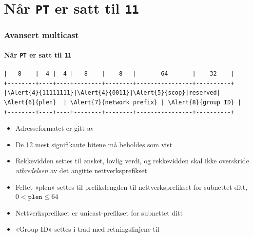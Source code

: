 \section{Når \texttt{PT} er satt til \texttt{11}}
\begin{frame}[fragile]%
  \frametitle{Avansert multicast}
  \framesubtitle{Når \texttt{PT} er satt til \texttt{11}}
  \pause
\begin{Verbatim}[commandchars=\\\{\},fontsize=\tiny]
|   8    |  4 |  4 |   8    |    8   |       64       |    32    |
+--------+----+----+--------+--------+----------------+----------+
|\Alert{4}{11111111}|\Alert{4}{0011}|\Alert{5}{scop}|reserved|  \Alert{6}{plen}  | \Alert{7}{network prefix} | \Alert{8}{group ID} |
+--------+----+----+--------+--------+----------------+----------+
\end{Verbatim}
  \pause
  \begin{itemize}[<+->]
  \item Adresseformatet er gitt av 
  \item \alert<4>{De 12 mest signifikante bitene} må beholdes som vist
  \item \alert<5>{Rekkevidden} settes til ønsket, lovlig verdi, og
    rekkevidden skal ikke overskride \textit{utbredelsen\/} av det
    angitte nettverksprefikset
  \item Feltet «plen» settes til \alert<6>{prefikslengden til
      nettverksprefikset for subnettet ditt}, \(0<\mathtt{plen}\le64\)
  \item \alert<7>{Nettverksprefikset} er unicast-prefikset for
    subnettet ditt
  \item \alert<8>{«Group ID»} settes i tråd med retningslinjene til 
  \end{itemize}
\end{frame}

